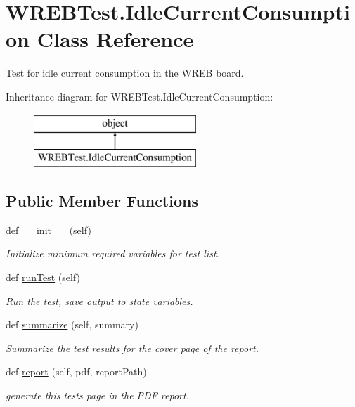 \hypertarget{class_w_r_e_b_test_1_1_idle_current_consumption}{}\section{W\+R\+E\+B\+Test.\+Idle\+Current\+Consumption Class Reference}
\label{class_w_r_e_b_test_1_1_idle_current_consumption}


Test for idle current consumption in the W\+R\+EB board.  


Inheritance diagram for W\+R\+E\+B\+Test.\+Idle\+Current\+Consumption\+:\begin{figure}[H]
\begin{center}
\leavevmode
\includegraphics[height=2.000000cm]{class_w_r_e_b_test_1_1_idle_current_consumption}
\end{center}
\end{figure}
\subsection*{Public Member Functions}
\begin{DoxyCompactItemize}
\item 
def \hyperlink{class_w_r_e_b_test_1_1_idle_current_consumption_a7aec47c458783e4d1cdfe0df5c4973e3}{\+\_\+\+\_\+init\+\_\+\+\_\+} (self)
\begin{DoxyCompactList}\small\item\em Initialize minimum required variables for test list. \end{DoxyCompactList}\item 
def \hyperlink{class_w_r_e_b_test_1_1_idle_current_consumption_aeaa52c734d7528a4c120939189e4a500}{run\+Test} (self)
\begin{DoxyCompactList}\small\item\em Run the test, save output to state variables. \end{DoxyCompactList}\item 
def \hyperlink{class_w_r_e_b_test_1_1_idle_current_consumption_a867a45d43d305dcb08d1db2560c8db33}{summarize} (self, summary)
\begin{DoxyCompactList}\small\item\em Summarize the test results for the cover page of the report. \end{DoxyCompactList}\item 
def \hyperlink{class_w_r_e_b_test_1_1_idle_current_consumption_acb8e46859a43b20689ca8f30ea05e5a6}{report} (self, pdf, report\+Path)
\begin{DoxyCompactList}\small\item\em generate this test\textquotesingle{}s page in the P\+DF report. \end{DoxyCompactList}\end{DoxyCompactItemize}


